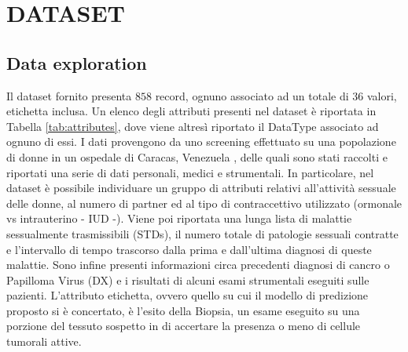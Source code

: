 \section{DATASET}
\subsection{Data exploration}
Il dataset fornito presenta $858$ record, ognuno associato ad un totale di $36$ valori, etichetta inclusa. Un elenco degli attributi presenti nel dataset è riportata in Tabella \ref{tab:attributes}, dove viene altresì riportato il DataType associato ad ognuno di essi. I dati provengono da uno screening effettuato su una popolazione di donne in un ospedale di Caracas, Venezuela , delle quali sono stati raccolti e riportati una serie di dati personali, medici e strumentali. In particolare, nel dataset è possibile individuare un gruppo di attributi relativi all'attività sessuale delle donne, al numero di partner ed al tipo di contraccettivo utilizzato (ormonale vs intrauterino - IUD -). Viene poi riportata una lunga lista di malattie sessualmente trasmissibili (STDs), il numero totale di patologie sessuali contratte e l'intervallo di tempo trascorso dalla prima e dall'ultima diagnosi di queste malattie. Sono infine presenti informazioni circa precedenti diagnosi di cancro o Papilloma Virus (DX) e i risultati di alcuni esami strumentali eseguiti sulle pazienti. L'attributo etichetta, ovvero quello su cui il modello di predizione proposto si è concertato, è l'esito della Biopsia, un esame eseguito su una porzione del tessuto sospetto in di accertare la presenza o meno di cellule tumorali attive. 
